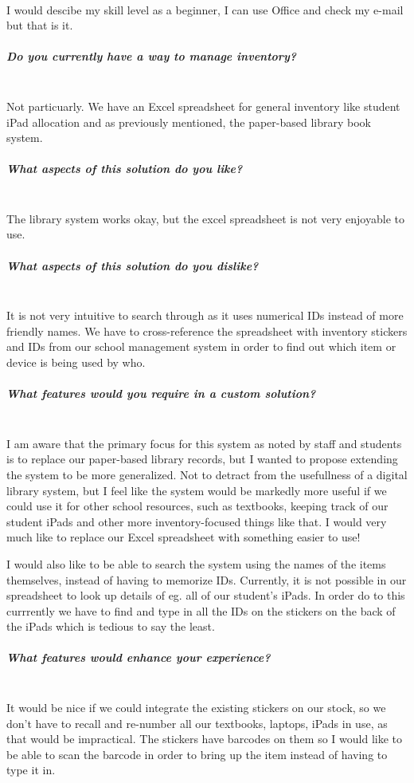 \documentclass[../../../main.tex]{subfiles}
\begin{document}
\noindent \\ I would descibe my skill level as a beginner, I can use Office and check my e-mail but that is it.

\subparagraph{Do you currently have a way to manage inventory?}

\noindent \\ Not particuarly. We have an Excel spreadsheet for general inventory like student iPad allocation and as previously mentioned, the paper-based library book system.

\subparagraph{What aspects of this solution do you like?}

\noindent \\ The library system works okay, but the excel spreadsheet is not very enjoyable to use.

\subparagraph{What aspects of this solution do you dislike?}

\noindent \\ It is not very intuitive to search through as it uses numerical IDs instead of more friendly names. We have to cross-reference the spreadsheet with inventory stickers and IDs from our school management system in order to find out which item or device is being used by who.

\subparagraph{What features would you require in a custom solution?}

\noindent \\ I am aware that the primary focus for this system as noted by staff and students
is to replace our paper-based library records, but I wanted to propose extending the system to
be more generalized. Not to detract from the usefullness of a digital library system,
but I feel like the system would be markedly more useful if we could use it for other school
resources, such as textbooks, keeping track of our student iPads and other more
inventory-focused things like that. I would very much like to replace our Excel spreadsheet with something easier to use!

I would also like to be able to search the system using the names of the items themselves, instead of having to memorize IDs.
Currently, it is not possible in our spreadsheet to look up details of eg. all of our student's iPads.
In order do to this currrently we have to find and type in all the IDs on the stickers on the back of the iPads which is tedious to say the least.

\subparagraph{What features would enhance your experience?}

\noindent \\ It would be nice if we could integrate the existing stickers on our stock, so we don't have to recall and re-number all our textbooks, laptops, iPads in use, as that would be impractical.
The stickers have barcodes on them so I would like to be able to scan the barcode in order to bring up the item instead of having to type it in.
\end{document}
